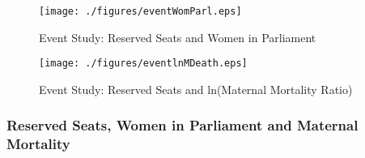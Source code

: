 \documentclass[9pt,letterpaper,subeqn]{beamer}
\begin{document}

\begin{frame}[label=quotaWP]
  \begin{figure}
    \caption{Event Study: Reserved Seats and Women in Parliament}
    \texttt{[image: ./figures/eventWomParl.eps]}
  \end{figure}
\end{frame}

\begin{frame}[label=quotaMMR]
  \begin{figure}
    \caption{Event Study: Reserved Seats and ln(Maternal Mortality Ratio)}
    \texttt{[image: ./figures/eventlnMDeath.eps]}
  \end{figure}
\end{frame}




\begin{frame}[label=quotaTabs]
  \frametitle{Reserved Seats, Women in Parliament and Maternal Mortality}
  
\end{frame}


\end{document}
